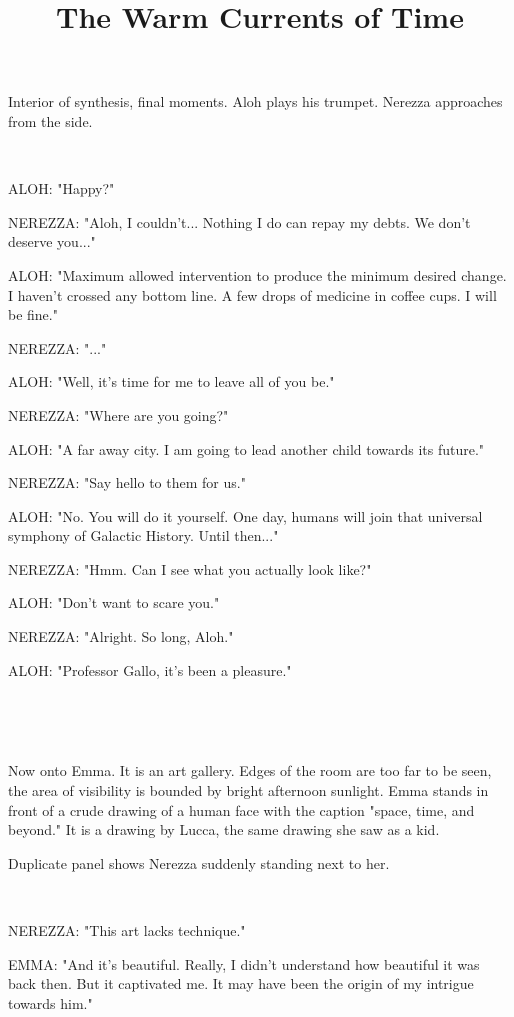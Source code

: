 \documentclass[11pt]{article}
\begin{document}
\ttfamily
\title{The Warm Currents of Time}
\maketitle

Interior of synthesis, final moments.
Aloh plays his trumpet.
Nerezza approaches from the side.

\ 

ALOH: "Happy?"

NEREZZA: "Aloh, I couldn't... 
Nothing I do can repay my debts.
We don't deserve you..."

ALOH: "Maximum allowed intervention to produce the minimum desired change.
I haven't crossed any bottom line. 
A few drops of medicine in coffee cups.
I will be fine."

NEREZZA: "..."

ALOH: "Well, it's time for me to leave all of you be."

NEREZZA: "Where are you going?"

ALOH: "A far away city. I am going to lead another child towards its future."

NEREZZA: "Say hello to them for us."

ALOH: "No. You will do it yourself.
One day, humans will join that universal symphony of Galactic History.
Until then..."

NEREZZA: "Hmm. Can I see what you actually look like?"

ALOH: "Don't want to scare you."

NEREZZA: "Alright. So long, Aloh."

ALOH: "Professor Gallo, it's been a pleasure."

\ 

\ 

Now onto Emma.
It is an art gallery. 
Edges of the room are too far to be seen, the area of visibility is bounded by bright afternoon sunlight.
Emma stands in front of a crude drawing of a human face with the caption "space, time, and beyond."
It is a drawing by Lucca, the same drawing she saw as a kid.

Duplicate panel shows Nerezza suddenly standing next to her.

\ 

NEREZZA: "This art lacks technique."

EMMA: "And it's beautiful.
Really, I didn't understand how beautiful it was back then.
But it captivated me.
It may have been the origin of my intrigue towards him."
\end{document}
